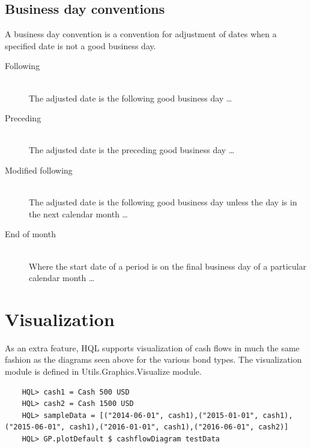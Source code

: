 \documentclass[11pt,a4paper]{article}
\numberwithin{equation}{section}
\begin{document}

	\subsection{Business day conventions}
	A business day convention is a convention for adjustment of dates when a specified date is not a good business day.
	\begin{description}
	  \item[Following] \hfill \\
	The adjusted date is the following good business day \ldots
	  \item[Preceding] \hfill \\
		The adjusted date is the preceding good business day \ldots
	  \item[Modified following] \hfill \\
	  The adjusted date is the following good business day unless the day is in the next calendar month \ldots
	  \item[End of month] \hfill \\
	Where the start date of a period is on the final business day of a particular calendar month \ldots
	\end{description}


	\section{Visualization}
	As an extra feature, HQL supports visualization of cash flows in much the same fashion as the diagrams seen above for the various bond types.
	The visualization module is defined in Utils.Graphics.Visualize module.

	\begin{lstlisting}	
	HQL> cash1 = Cash 500 USD
	HQL> cash2 = Cash 1500 USD
	HQL> sampleData = [("2014-06-01", cash1),("2015-01-01", cash1),("2015-06-01", cash1),("2016-01-01", cash1),("2016-06-01", cash2)]
	HQL> GP.plotDefault $ cashflowDiagram testData	
	\end{lstlisting}


\newpage



\end{document}
